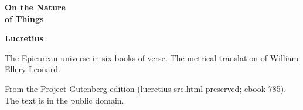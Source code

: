 \documentclass[11pt,letterpaper]{article}
\begin{document}
\color{ink}

\begin{titlepage}
\centering
\vspace*{4em}
{\LARGE\bfseries\color{heading} On the Nature\\[0.3em]of Things\par}
\vspace{2em}
{\Large\bfseries\color{heading} Lucretius\par}
\vspace{2.5em}
{\itshape\color{subhead}\parbox{0.8\linewidth}{\centering The Epicurean universe in six books of verse. The metrical translation of William Ellery Leonard.\par}}
\vfill
{\small From the Project Gutenberg edition (lucretius-src.html preserved; ebook 785). The text is in the public domain.\par}
\vspace{2em}
\end{titlepage}

\tableofcontents


\end{document}
